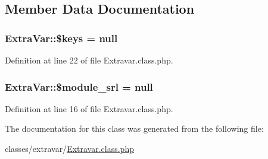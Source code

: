 \subsection{Member Data Documentation}
\hypertarget{classExtraVar_ac2aee2ca8a3299c952ba8f155eaadc64}{}
\subsubsection[{\$keys}]{\setlength{\rightskip}{0pt plus 5cm}Extra\+Var\+::\$keys = null}\label{classExtraVar_ac2aee2ca8a3299c952ba8f155eaadc64}


Definition at line 22 of file Extravar.\+class.\+php.

\hypertarget{classExtraVar_a3a84e48f2cdf01660b2844244f8fd9f7}{}
\subsubsection[{\$module\+\_\+srl}]{\setlength{\rightskip}{0pt plus 5cm}Extra\+Var\+::\$module\+\_\+srl = null}\label{classExtraVar_a3a84e48f2cdf01660b2844244f8fd9f7}


Definition at line 16 of file Extravar.\+class.\+php.



The documentation for this class was generated from the following file\+:\begin{DoxyCompactItemize}
\item 
classes/extravar/\hyperlink{Extravar_8class_8php}{Extravar.\+class.\+php}\end{DoxyCompactItemize}
